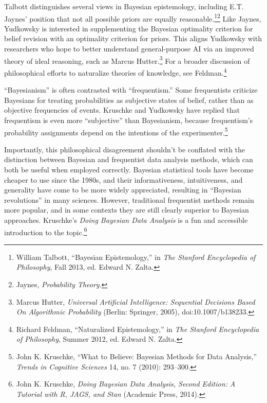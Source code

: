 {
 Talbott distinguishes several views in Bayesian epistemology,
including E.T. Jaynes' position that not all possible
priors are equally reasonable.\footnote{William Talbott, ``Bayesian
Epistemology,'' in \textit{The Stanford Encyclopedia
of Philosophy}, Fall 2013, ed. Edward N. Zalta.}\supercomma\footnote{Jaynes, \textit{Probability Theory}.} Like Jaynes,
Yudkowsky is interested in supplementing the Bayesian optimality
criterion for belief revision with an optimality criterion for priors.
This aligns Yudkowsky with researchers who hope to better understand
general-purpose AI via an improved theory of ideal reasoning, such as
Marcus Hutter.\footnote{Marcus Hutter, \textit{Universal Artificial Intelligence:
Sequential Decisions Based On Algorithmic Probability} (Berlin:
Springer, 2005), doi:10.1007/b138233.} For a broader discussion of
philosophical efforts to naturalize theories of knowledge, see
Feldman.\footnote{Richard Feldman, ``Naturalized
Epistemology,'' in \textit{The Stanford Encyclopedia
of Philosophy}, Summer 2012, ed. Edward N. Zalta.}}

{
 ``Bayesianism'' is often
contrasted with ``frequentism.''
Some frequentists criticize Bayesians for treating probabilities as
subjective states of belief, rather than as objective frequencies of
events. Kruschke and Yudkowsky have replied that frequentism is even
more ``subjective'' than
Bayesianism, because frequentism's probability
assignments depend on the intentions of the
experimenter.\footnote{John K. Kruschke, ``What to Believe: Bayesian
Methods for Data Analysis,'' \textit{Trends in
Cognitive Sciences} 14, no. 7 (2010): 293--300.}}

{
 Importantly, this philosophical disagreement
shouldn't be conflated with the distinction between
Bayesian and frequentist data analysis methods, which can both be
useful when employed correctly. Bayesian statistical tools have become
cheaper to use since the 1980s, and their informativeness,
intuitiveness, and generality have come to be more widely appreciated,
resulting in ``Bayesian
revolutions'' in many sciences. However, traditional
frequentist methods remain more popular, and in some contexts they are
still clearly superior to Bayesian approaches.
Kruschke's \textit{Doing Bayesian Data Analysis} is a
fun and accessible introduction to the topic.\footnote{John K. Kruschke, \textit{Doing Bayesian Data Analysis, Second
Edition: A Tutorial with R, JAGS, and Stan} (Academic Press, 2014).}}

